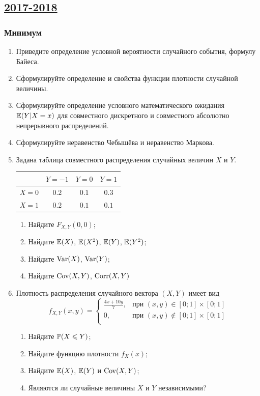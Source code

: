 \newpage
\subsection[2017-2018]{\hyperref[sec:sol_kr_02_2017_2018]{2017-2018}}
\label{sec:kr_02_2017_2018}

\subsubsection*{Минимум}

\begin{enumerate}
\item Приведите определение условной вероятности случайного события, формулу Байеса.
\item Сформулируйте определение и свойства функции плотности случайной величины.
\item Сформулируйте определение  условного математического ожидания $\E(Y|X=x)$
для совместного дискретного и совместного абсолютно непрерывного распределений.
\item Сформулируйте неравенство Чебышёва и неравенство Маркова.

\item Задана таблица совместного распределения случайных величин $X$ и $Y$.
\begin{center}
\begin{tabular}{lccc}
\toprule
                      & $Y=-1$  & $Y=0$   & $Y=1$   \\ \midrule
$X=0$                 & $0.2$ & $0.1$ & $0.3$ \\
$X=1$                 & $0.2$ & $0.1$ & $0.1$ \\
\bottomrule
\end{tabular}
\end{center}

\begin{enumerate}
    \item Найдите $F_{X,Y}(0, 0)$;
    \item Найдите $\E(X)$, $\E(X^2)$, $\E(Y)$, $\E(Y^2)$;
    \item Найдите $\Var(X)$, $\Var(Y)$;
    \item Найдите $\Cov(X, Y)$, $\Corr(X, Y)$
\end{enumerate}

\item Плотность распределения случайного вектора $(X,Y)$ имеет вид
\[
f_{X,Y}(x,y) =
\begin{cases}
\frac{4x+10y}{7}, & \text{при } (x,y) \in [0;1] \times [0;1] \\
0 , & \text{при } (x,y) \not\in [0;1] \times [0;1] \\
\end{cases}
\]
\begin{enumerate}
\item Найдите $\P(X \leq Y)$;
\item Найдите функцию плотности $f_X(x)$;
\item Найдите $\E(X)$, $\E(Y)$ и $\Cov(X, Y)$;
\item Являются ли случайные величины $X$ и $Y$ независимыми?
\end{enumerate}
\end{enumerate}

